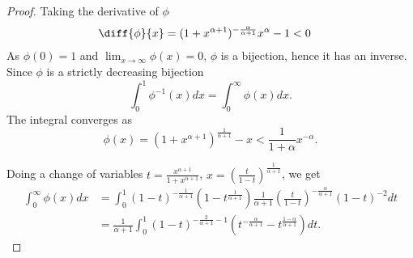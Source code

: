\documentclass[10pt]{article}
\theoremstyle{plain}
\theoremstyle{definition}
\begin{document}
	\begin{proof}
		Taking the derivative of $\phi$
		\begin{align}
			\diff{\phi}{x}&=(1+x^{\alpha+1})^{-\frac{\alpha}{\alpha+1}}x^{\alpha}-1<0
		\end{align}
		As $\phi(0)=1$ and $\lim_{x\to\infty}\phi(x)=0$, $\phi$ is a bijection, hence it has an inverse. Since $\phi$ is a strictly decreasing bijection
		\begin{equation}
			\int_{0}^{1} \phi^{-1}(x)dx=\int_{0}^{\infty} \phi(x)dx.
		\end{equation}
		The integral converges as
		\begin{equation}
			\phi(x)=(1+x^{\alpha+1})^{\frac{1}{\alpha+1}}-x<\frac{1}{1+\alpha}x^{-\alpha}.
		\end{equation}
		
		Doing a change of variables $t=\frac{x^{\alpha+1}}{1+x^{\alpha+1}}$, $x=(\frac{t}{1-t})^{\frac{1}{\alpha+1}}$, we get
		\begin{align}
			\int_{0}^{\infty} \phi(x)dx&=\int_{0}^{1} (1-t)^{-\frac{1}{\alpha+1}}(1-t^{\frac{1}{\alpha+1}})
			\frac{1}{\alpha+1}\left(\frac{t}{1-t}\right)^{-\frac{\alpha}{\alpha+1}}(1-t)^{-2}dt\\
			&=\frac{1}{\alpha+1}\int_{0}^{1} (1-t)^{-\frac{2}{\alpha+1}-1}
			(t^{-\frac{\alpha}{\alpha+1}}-t^{\frac{1-\alpha}{\alpha+1}})dt.
		\end{align}
		

\end{proof}
\end{document}
